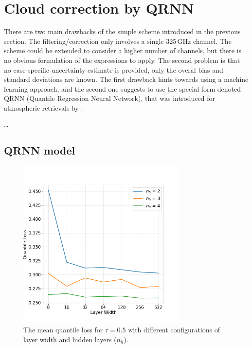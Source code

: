 \documentclass[12pt]{article}
\begin{document}
\section{Cloud correction by QRNN}
%
There are two main drawbacks of the simple scheme introduced in the previous
section. The filtering/correction only involves a single 325\,GHz channel. The
scheme could be extended to consider a higher number of channels, but there is
no obvious formulation of the expressions to apply. The second problem is that
no case-specific uncertainty estimate is provided, only the overal bias and
standard deviations are known. The first drawback hints towards using a machine
learning approach, and the second one suggests to use the special form denoted
QRNN (Quantile Regression Neural Network), that was introduced for atmospheric
retrievals by \citet{pfreundschuh:aneur:18}.

\dots

\subsection{QRNN model}
%
\begin{figure}[!ht]
	\centering
	\includegraphics[height=85mm]{quantile_loss_median.png}
	\caption{The mean quantile loss for $\tau = 0.5$ with different configurations of layer width and hidden layers ($n_h$).}
	\label{fig:quantile_loss_median}
\end{figure}
\end{document}
